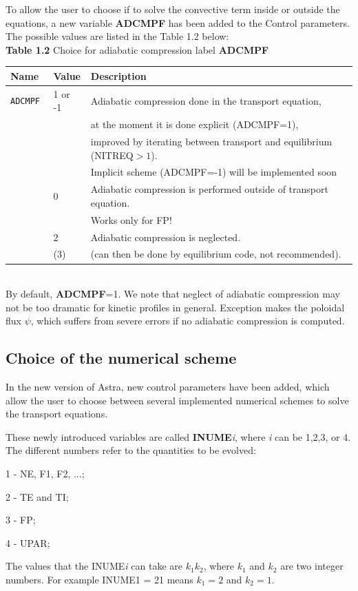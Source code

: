To allow the user to choose if to solve the convective term inside or outside 
the equations, a new variable {\bf ADCMPF} has been added to the Control 
parameters. The possible values are listed in the Table 1.2 below:
\\
{\bf Table 1.2} Choice for adiabatic compression label {\bf ADCMPF}\\[2ex]
\begin{tabular}{|l|l|l|}					\hline
\bf Name	&\bf Value & Description\\ \hline
\tt ADCMPF 	& 1 or -1 & Adiabatic compression done in the transport equation,\\ 
\tt &   &  at the moment it is done explicit (ADCMPF=1), \\
\tt &   &  improved by iterating between transport and equilibrium (NITREQ$>1$).\\
\tt &   &  Implicit scheme (ADCMPF=-1) will be implemented soon\\
\tt & 0 &  Adiabatic compression is performed outside of transport equation. \\
\tt &   &  Works only for FP! \\ 
\tt & 2 &  Adiabatic compression is neglected.\\ 
\tt &(3)&  (can then be done by equilibrium code, not recommended).\\ 
\hline
\end{tabular}
\bigskip\\
By default, {\bf ADCMPF}=1.  
We note that neglect of adiabatic compression may 
not be too dramatic for kinetic profiles in general. Exception makes the 
poloidal flux $\psi$, which suffers from severe errors if no adiabatic 
compression is computed.
%
\subsection{Choice of the numerical scheme}
In the new version of Astra, new control parameters have been added, which allow
the user to choose between several implemented numerical schemes to solve the 
transport equations.

These newly introduced variables are called {\bf INUME}{\it i}, where {\it i} can be 1,2,3, or 4. The different numbers refer to the quantities to be evolved:

1 - NE, F1, F2, ...;

2 - TE and TI;

3 - FP;

4 - UPAR;

The values that the INUME{\it i} can take are $k_1 k_2$, where $k_1$ and $k_2$ are two integer numbers. For example INUME1 = 21 means $k_1 = 2$ and $k_2=1$. 


